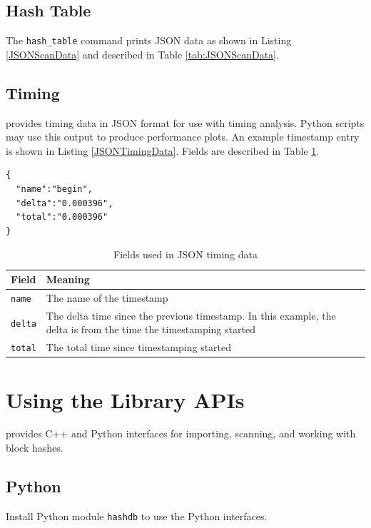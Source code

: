 \documentclass[11pt,fleqn]{article} %
\begin{document}
\subsection{Hash Table}
The \verb+hash_table+ command prints JSON data as shown in Listing \ref{JSONScanData} and described in Table \ref{tab:JSONScanData}.\\

\subsection{Timing}
\hdb provides timing data in JSON format for use with timing analysis. Python scripts may use this output to produce performance plots. An example timestamp entry is shown in Listing \ref{JSONTimingData}. Fields are described in Table \ref{tab:JSONTimingData}.\\

\lstset{style=customfile}
\begin{lstlisting}[caption={Example JSON timestamp format}, label=JSONTimingData]
{
  "name":"begin",
  "delta":"0.000396",
  "total":"0.000396"
}
\end{lstlisting}

\begin{table}[!ht]

\centering
\caption{Fields used in JSON timing data}
\label{tab:JSONTimingData}
\begin{tabular}{|p{5 cm}|p{8.8 cm}|}
\hline \hline
\textbf{Field} & \textbf{Meaning} \\
\hline
\verb+name+ & The name of the timestamp\\
\hline
\verb+delta+ & The delta time since the previous timestamp. In this example, the delta is from the time the timestamping started\\
\hline
\verb+total+ & The total time since timestamping started\\
\hline
\end{tabular}
\end{table}



\section{Using the \hdb Library APIs}
\label{APIs}
\hdb provides C++ and Python interfaces for importing, scanning, and working with block hashes.

\subsection{Python}
Install Python module \verb+hashdb+ to use the \hdb Python interfaces.
\end{document}
